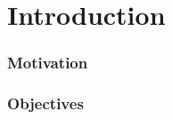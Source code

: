 \section{Introduction}


\begin{frame}
    \frametitle{Motivation}
    \vspace{3mm}



    \vfill 
\end{frame}


\begin{frame}
    \frametitle{Objectives}
    \vspace{3mm}


    \vfill 
\end{frame}